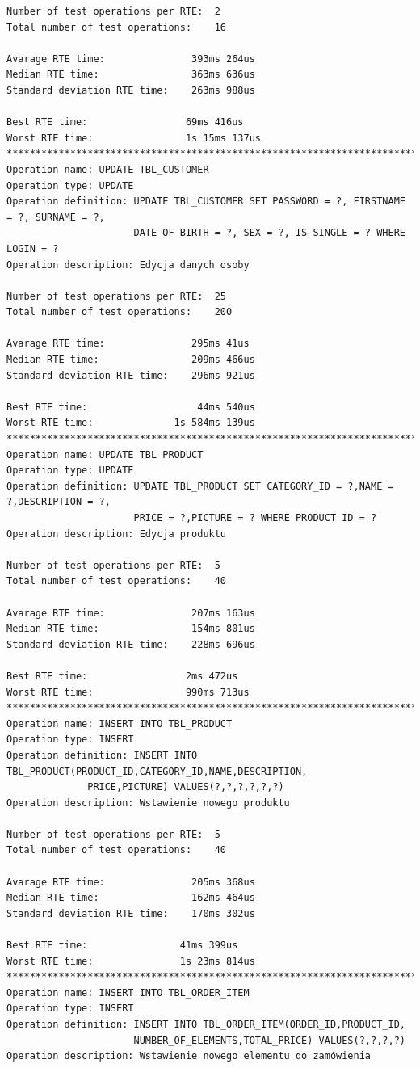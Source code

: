 \begin{Verbatim}
Number of test operations per RTE:  2
Total number of test operations:    16

Avarage RTE time:               393ms 264us
Median RTE time:                363ms 636us
Standard deviation RTE time:    263ms 988us

Best RTE time:                 69ms 416us
Worst RTE time:                1s 15ms 137us
*********************************************************************************
Operation name: UPDATE TBL_CUSTOMER
Operation type: UPDATE
Operation definition: UPDATE TBL_CUSTOMER SET PASSWORD = ?, FIRSTNAME = ?, SURNAME = ?, 
                      DATE_OF_BIRTH = ?, SEX = ?, IS_SINGLE = ? WHERE LOGIN = ?
Operation description: Edycja danych osoby

Number of test operations per RTE:  25
Total number of test operations:    200

Avarage RTE time:               295ms 41us
Median RTE time:                209ms 466us
Standard deviation RTE time:    296ms 921us

Best RTE time:                   44ms 540us
Worst RTE time:              1s 584ms 139us
*********************************************************************************
Operation name: UPDATE TBL_PRODUCT
Operation type: UPDATE
Operation definition: UPDATE TBL_PRODUCT SET CATEGORY_ID = ?,NAME = ?,DESCRIPTION = ?,
                      PRICE = ?,PICTURE = ? WHERE PRODUCT_ID = ?
Operation description: Edycja produktu

Number of test operations per RTE:  5
Total number of test operations:    40

Avarage RTE time:               207ms 163us
Median RTE time:                154ms 801us
Standard deviation RTE time:    228ms 696us

Best RTE time:                 2ms 472us
Worst RTE time:                990ms 713us
*********************************************************************************
Operation name: INSERT INTO TBL_PRODUCT
Operation type: INSERT
Operation definition: INSERT INTO TBL_PRODUCT(PRODUCT_ID,CATEGORY_ID,NAME,DESCRIPTION,
		      PRICE,PICTURE) VALUES(?,?,?,?,?,?)
Operation description: Wstawienie nowego produktu

Number of test operations per RTE:  5
Total number of test operations:    40

Avarage RTE time:               205ms 368us
Median RTE time:                162ms 464us
Standard deviation RTE time:    170ms 302us

Best RTE time:                41ms 399us
Worst RTE time:               1s 23ms 814us
*********************************************************************************
Operation name: INSERT INTO TBL_ORDER_ITEM
Operation type: INSERT
Operation definition: INSERT INTO TBL_ORDER_ITEM(ORDER_ID,PRODUCT_ID,
                      NUMBER_OF_ELEMENTS,TOTAL_PRICE) VALUES(?,?,?,?)
Operation description: Wstawienie nowego elementu do zamówienia


\end{Verbatim}
